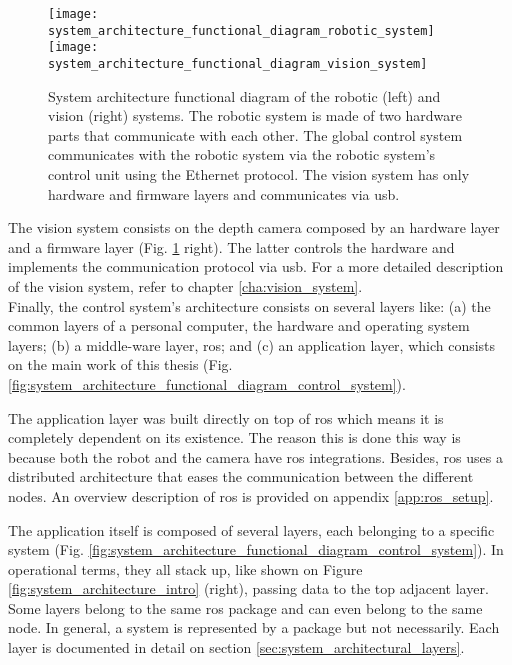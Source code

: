 \begin{figure}[htbp]
	\centering
	\texttt{[image: system\_architecture\_functional\_diagram\_robotic\_system]}
	\hspace{0.1in}
	\texttt{[image: system\_architecture\_functional\_diagram\_vision\_system]}
	\caption[System architecture functional diagram of the robotic and vision systems.]{System architecture functional diagram of the robotic (left) and vision (right) systems. The robotic system is made of two hardware parts that communicate with each other. The global control system communicates with the robotic system via the robotic system's control unit using the Ethernet protocol. The vision system has only hardware and firmware layers and communicates via \gls{usb}.}
	\label{fig:system_architecture_functional_diagram_robotic_vision_system}
\end{figure}

The vision system consists on the depth camera composed by an hardware layer and a firmware layer (Fig. \ref{fig:system_architecture_functional_diagram_robotic_vision_system} right). The latter controls the hardware and implements the communication protocol via \gls{usb}. For a more detailed description of the vision system, refer to chapter \ref{cha:vision_system}.\\

Finally, the control system's architecture consists on several layers like: (a) the common layers of a personal computer, the hardware and operating system layers; (b) a middle-ware layer, \gls{ros}; and (c) an application layer, which consists on the main work of this thesis (Fig. \ref{fig:system_architecture_functional_diagram_control_system}).

The application layer was built directly on top of \gls{ros} which means it is completely dependent on its existence. The reason this is done this way is because both the robot and the camera have \gls{ros} integrations. Besides, \gls{ros} uses a distributed architecture that eases the communication between the different nodes. An overview description of \gls{ros} is provided on appendix \ref{app:ros_setup}.

The application itself is composed of several layers, each belonging to a specific system (Fig. \ref{fig:system_architecture_functional_diagram_control_system}). In operational terms, they all stack up, like shown on Figure \ref{fig:system_architecture_intro} (right), passing data to the top adjacent layer. Some layers belong to the same \gls{ros} package and can even belong to the same node. In general, a system is represented by a package but not necessarily. Each layer is documented in detail on section \ref{sec:system_architectural_layers}.

